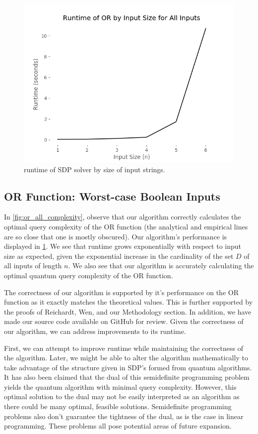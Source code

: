 \begin{figure}[ht]
\centering
\includegraphics[scale=.4]{figures/or_all_runtime.png}
\caption{runtime of SDP solver by size of input strings.}
\label{fig:or_all_runtime}
\end{figure}

\subsection{OR Function: Worst-case Boolean Inputs}\label{sec:speed}
In \cref{fig:or_all_complexity}, observe that our algorithm
correctly calculates the optimal query complexity of the OR function (the
analytical and empirical lines are so close that one
is mostly obscured).
Our algorithm's performance is displayed in \cref{fig:or_all_runtime}.
We see that runtime grows exponentially with respect to input size as expected, 
given the exponential increase in the cardinality of the set $D$ of all
inputs of length $n$. 
We also see that our algorithm is accurately calculating the
optimal quantum query complexity of the OR function. 

The correctness of our algorithm is supported by it's performance on the OR function as it exactly matches the theoretical values. This is further supported by the proofs of Reichardt, Wen, and our Methodology section. In addition, we have made our source code available on GitHub for review. Given the correctness of our algorithm, we can address improvements to its runtime.

First, we can attempt to improve runtime while
maintaining the correctness of the algorithm. Later,
we might be able to alter the algorithm
mathematically to take advantage of the structure
given in SDP's formed from quantum algorithms. 
It has also been claimed that the dual of this semidefinite
programming problem yields the quantum algorithm with minimal query complexity.
However, this optimal solution to the dual may not be easily 
interpreted as an algorithm as there could be many optimal, feasible solutions. 
Semidefinite programming problems also don't guarantee the tightness of the dual,
as is the case in linear programming. 
These problems all pose potential areas of future expansion.


